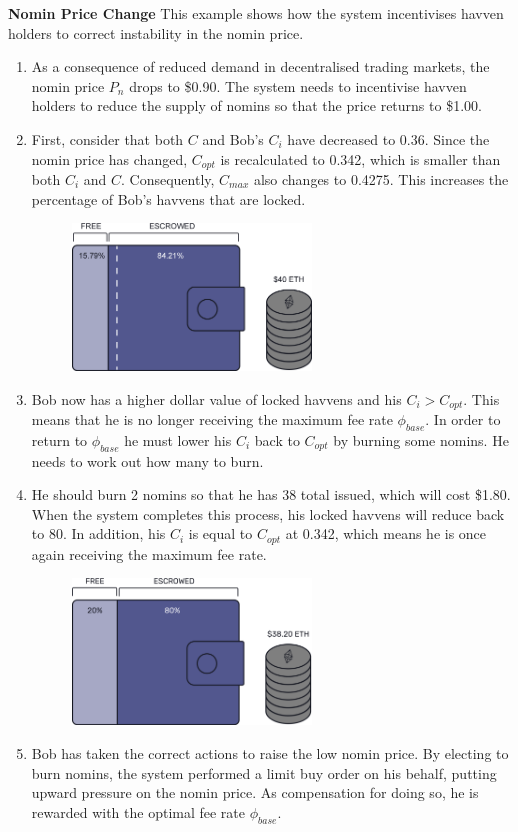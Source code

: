 \noindent \textbf{Nomin Price Change} This example shows how the system
incentivises havven holders to correct instability in the nomin price.

\begin{enumerate}
\item{As a consequence of reduced demand in decentralised trading markets, the nomin price \(P_n\) drops to \$0.90. The system needs to incentivise havven holders to reduce the supply of nomins so that the price returns to \$1.00.}
\item{First, consider that both \(C\) and Bob's \(C_i\) have decreased to 0.36. Since the nomin price has changed, \(C_{opt}\) is recalculated to 0.342, which is smaller than both \(C_i\) and \(C\). Consequently, \(C_{max}\) also changes to 0.4275. This increases the percentage of Bob's havvens that are locked.}
\begin{figure}[h!]
\centering
    \includegraphics[width=0.6\textwidth]{img/pn_drop}
\end{figure}
\item{Bob now has a higher dollar value of locked havvens and his \(C_i > C_{opt}\). This means that he is no longer receiving the maximum fee rate \(\phi_{base}\). In order to return to \(\phi_{base}\) he must lower his \(C_i\) back to \(C_{opt}\) by burning some nomins. He needs to work out how many to burn.}
\item{He should burn 2 nomins so that he has 38 total issued, which will cost \$1.80. When the system completes this process, his locked havvens will reduce back to 80. In addition, his \(C_i\) is equal to \(C_{opt}\) at 0.342, which means he is once again receiving the maximum fee rate.}
\begin{figure}[h!]
\centering
    \includegraphics[width=0.6\textwidth]{img/post_burn}
\end{figure}
\item{Bob has taken the correct actions to raise the low nomin price. By electing to burn nomins, the system performed a limit buy order on his behalf, putting upward pressure on the nomin price. As compensation for doing so, he is rewarded with the optimal fee rate \(\phi_{base}\).}
\end{enumerate}

